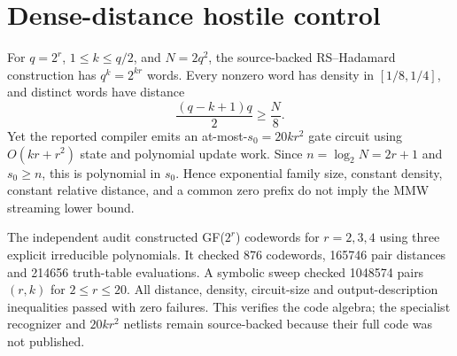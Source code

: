 \documentclass[11pt]{article}
\begin{document}
\section*{Dense-distance hostile control}
For $q=2^r$, $1\le k\le q/2$, and $N=2q^2$, the source-backed
RS--Hadamard construction has $q^k=2^{kr}$ words.  Every nonzero word has
density in $[1/8,1/4]$, and distinct words have distance
\[
 \frac{(q-k+1)q}{2}\ge \frac N8.
\]
Yet the reported compiler emits an at-most-$s_0=20kr^2$ gate circuit using
$O(kr+r^2)$ state and polynomial update work.  Since $n=\log_2N=2r+1$ and
$s_0\ge n$, this is polynomial in $s_0$.  Hence exponential family size,
constant density, constant relative distance, and a common zero prefix do not
imply the MMW streaming lower bound.

The independent audit constructed GF($2^r$) codewords for $r=2,3,4$ using
three explicit irreducible polynomials.  It checked 876 codewords, 165746
pair distances and 214656 truth-table evaluations.  A symbolic sweep checked
1048574 pairs $(r,k)$ for $2\le r\le20$.  All distance, density, circuit-size
and output-description inequalities passed with zero failures.  This verifies
the code algebra; the specialist recognizer and $20kr^2$ netlists remain
source-backed because their full code was not published.
\end{document}

